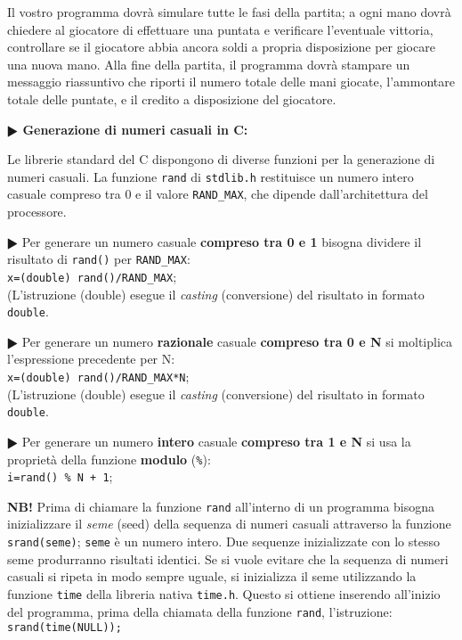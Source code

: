 \documentclass[11pt]{article}
\begin{document}
Il vostro programma dovr\`a simulare tutte le fasi della partita; a ogni mano dovr\`a chiedere al giocatore di effettuare una puntata e verificare l'eventuale vittoria, controllare se il giocatore abbia ancora soldi a propria disposizione per giocare una nuova mano. Alla fine della partita, il programma dovr\`a stampare un messaggio riassuntivo che riporti il numero totale delle mani giocate, l'ammontare totale delle puntate, e il credito a disposizione del giocatore.



\vspace{4mm}

\begin{mdframed}[backgroundcolor=panna]
\textbf{$\RHD$ Generazione di numeri casuali in C:}

Le librerie standard del C dispongono di diverse funzioni per la generazione di numeri casuali.
La funzione \texttt{rand} di \texttt{stdlib.h} restituisce un numero intero casuale compreso tra 0 e il valore \texttt{RAND\_MAX}, che dipende dall'architettura del processore.

\textbf{$\RHD$} Per generare un numero casuale {\bf compreso tra 0 e 1} bisogna dividere il risultato di \texttt{rand()} per
\texttt{RAND\_MAX}:
\\
\texttt{x=(double) rand()/{RAND\_MAX}};
\\
(L'istruzione (double) esegue il {\em casting} (conversione) del risultato in formato \texttt{double}.

\textbf{$\RHD$} Per generare un numero {\bf razionale} casuale {\bf compreso tra 0 e N} si moltiplica l'espressione precedente per N:
\\
\texttt{x=(double) rand()/{RAND\_MAX}*N};
\\
(L'istruzione (double) esegue il {\em casting} (conversione) del risultato in formato \texttt{double}.

\textbf{$\RHD$} Per generare un numero {\bf intero} casuale {\bf compreso tra 1 e N} si usa la propriet\`a della funzione
{\bf modulo} (\texttt{\%}):
\\
\texttt{i=rand() \% N + 1};

{\bf NB!} Prima di chiamare la funzione \texttt{rand} all'interno di un programma bisogna inizializzare il {\em seme} (seed) della sequenza di numeri casuali attraverso la funzione \texttt{srand(seme)}; \texttt{seme} \`e un numero intero. Due sequenze inizializzate con lo stesso seme produrranno risultati identici. Se si vuole evitare che la sequenza di numeri casuali si ripeta in modo sempre uguale, si inizializza il seme utilizzando la funzione \texttt{time} della libreria
nativa \texttt{time.h}. Questo si ottiene inserendo all'inizio del programma, prima della chiamata della funzione \texttt{rand}, l'istruzione:
\\
\texttt{srand(time(NULL));}
\\
\end{mdframed}
\end{document}
